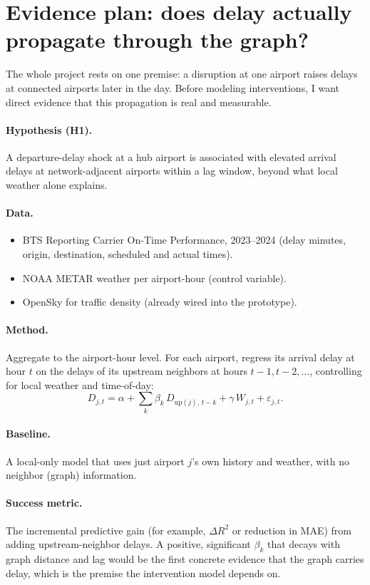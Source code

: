 \documentclass[11pt]{article}
\begin{document}
\section{Evidence plan: does delay actually propagate through the graph?}
The whole project rests on one premise: a disruption at one airport raises
delays at connected airports later in the day. Before modeling interventions,
I want direct evidence that this propagation is real and measurable.

\paragraph{Hypothesis (H1).} A departure-delay shock at a hub airport is
associated with elevated arrival delays at network-adjacent airports within a
lag window, beyond what local weather alone explains.

\paragraph{Data.}
\begin{itemize}[leftmargin=*]
  \item BTS Reporting Carrier On-Time Performance, 2023--2024 (delay minutes,
        origin, destination, scheduled and actual times).
  \item NOAA METAR weather per airport-hour (control variable).
  \item OpenSky for traffic density (already wired into the prototype).
\end{itemize}

\paragraph{Method.} Aggregate to the airport-hour level. For each airport,
regress its arrival delay at hour $t$ on the delays of its upstream neighbors
at hours $t-1, t-2, \dots$, controlling for local weather and time-of-day:
\[
D_{j,t} = \alpha + \sum_{k} \beta_k \, D_{\text{up}(j),\,t-k} + \gamma\, W_{j,t} + \varepsilon_{j,t}.
\]

\paragraph{Baseline.} A local-only model that uses just airport $j$'s own
history and weather, with no neighbor (graph) information.

\paragraph{Success metric.} The incremental predictive gain (for example,
$\Delta R^2$ or reduction in MAE) from adding upstream-neighbor delays. A
positive, significant $\beta_k$ that decays with graph distance and lag would
be the first concrete evidence that the graph carries delay, which is the
premise the intervention model depends on.
\end{document}
